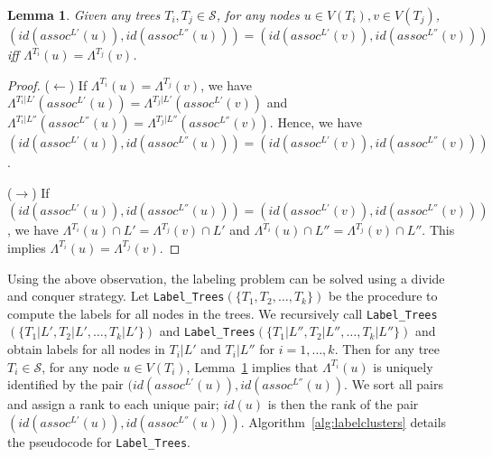 \documentclass[final,1p,times]{elsarticle}
\newcommand{\leafset}{\Lambda}
\newtheorem{lemma}[theorem]{Lemma}
\begin{document}
    \begin{lemma}
        \label{lem:labelclusterscorrectness}
        Given any trees $T_i, T_j \in \mathcal{S}$, for any nodes $u \in V(T_i), v \in V(T_j)$, $(id(assoc^{L'}(u)), id(assoc^{L''}(u))) = (id(assoc^{L'}(v)), id(assoc^{L''}(v)))$ iff $\leafset^{T_i}(u) = \leafset^{T_j}(v)$.
    \end{lemma}
        \begin{proof}
		($\leftarrow$) If $\leafset^{T_i}(u) = \leafset^{T_j}(v)$, we have $\leafset^{T_i|L'}(assoc^{L'}(u)) = \leafset^{T_j|L'}(assoc^{L'}(v))$ and $\leafset^{T_i|L''}(assoc^{L''}(u)) = \leafset^{T_j|L''}(assoc^{L''}(v))$. Hence, we have $(id(assoc^{L'}(u)), id(assoc^{L''}(u))) = (id(assoc^{L'}(v)), id(assoc^{L''}(v)))$.

		($\rightarrow$) If $(id(assoc^{L'}(u)), id(assoc^{L''}(u))) = (id(assoc^{L'}(v)), id(assoc^{L''}(v)))$, we have $\Lambda^{T_i}(u) \cap L' = \Lambda^{T_j}(v) \cap L'$ and $\Lambda^{T_i}(u) \cap L'' = \Lambda^{T_j}(v) \cap L''$. This implies  $\leafset^{T_i}(u) = \leafset^{T_j}(v)$.
        \end{proof}


    Using the above observation, the labeling problem can be solved using a divide and conquer strategy. Let \texttt{Label\_Trees}$(\{T_1, T_2, \dots, T_k\})$ be the procedure to compute the labels for all nodes in the trees. 
    We recursively call \texttt{Label\_Trees}$(\{T_1|L', T_2|L', \dots, T_k|L'\})$ and \texttt{Label\_Trees}$(\{T_1|L'', T_2|L'', \dots, T_k|L''\})$ and obtain labels for all nodes in $T_i|L'$ and $T_i|L''$ for $i=1, \ldots, k$.
    Then for any tree $T_i \in \mathcal{S}$, for any node $u \in V(T_i)$, Lemma~\ref{lem:labelclusterscorrectness} implies that $\leafset^{T_i}(u)$ is uniquely identified by the pair $(id(assoc^{L'}(u)), id(assoc^{L''}(u))$.
    We sort all pairs and assign a rank to each unique pair; $id(u)$ is then the rank of the pair $(id(assoc^{L'}(u)), id(assoc^{L''}(u)))$. Algorithm~\ref{alg:labelclusters} details the pseudocode for \texttt{Label\_Trees}.
\end{document}
